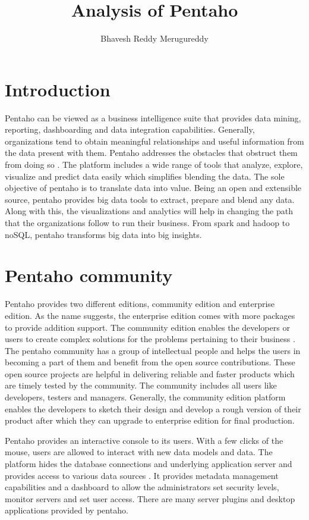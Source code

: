 \documentclass[9pt,twocolumn,twoside]{../../styles/osajnl}
\title{ Analysis of Pentaho}
\author[1,*]{Bhavesh Reddy Merugureddy}
\affil[1]{School of Informatics and Computing, Bloomington, IN 47408, U.S.A.}
\affil[*]{Corresponding authors: bmerugur@umail.iu.edu}
\begin{document}
\maketitle

\section{Introduction}

Pentaho can be viewed as a business intelligence suite that provides
data mining, reporting, dashboarding and data integration
capabilities. Generally, organizations tend to obtain meaningful
relationships and useful information from the data present with
them. Pentaho addresses the obstacles that obstruct them from doing so
\cite{pent1}. The platform includes a wide range of tools that
analyze, explore, visualize and predict data easily which simplifies
blending the data. The sole objective of pentaho is to translate data
into value. Being an open and extensible source, pentaho provides big
data tools to extract, prepare and blend any data. Along with this,
the visualizations and analytics will help in changing the path that
the organizations follow to run their business. From spark and hadoop
to noSQL, pentaho transforms big data into big insights.

\section{Pentaho community}

Pentaho provides two different editions, community edition and
enterprise edition. As the name suggests, the enterprise edition comes
with more packages to provide addition support. The community edition
enables the developers or users to create complex solutions for the
problems pertaining to their business \cite{pent2}. The pentaho
community has a group of intellectual people and helps the users in
becoming a part of them and benefit from the open source
contributions. These open source projects are helpful in delivering
reliable and faster products which are timely tested by the
community. The community includes all users like developers, testers
and managers. Generally, the community edition platform enables the
developers to sketch their design and develop a rough version of their
product after which they can upgrade to enterprise edition for final
production.

Pentaho provides an interactive console to its users. With a few
clicks of the mouse, users are allowed to interact with new data
models and data. The platform hides the database connections and
underlying application server and provides access to various data
sources \cite{pent3}. It provides metadata management capabilities and
a dashboard to allow the administrators set security levels, monitor
servers and set user access. There are many server plugins and desktop
applications provided by pentaho.
\end{document}
